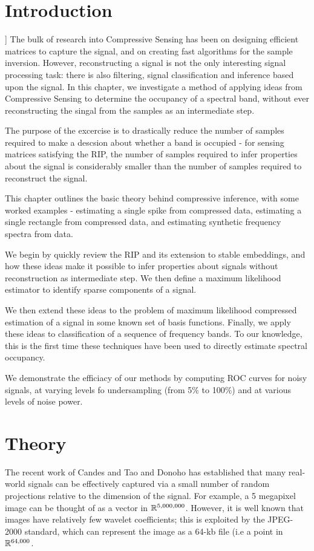\section{Introduction}]
The bulk of research into Compressive Sensing has been on designing efficient matrices to capture the signal, and on creating fast algorithms for the sample inversion. However, reconstructing a signal is not the only interesting signal processing task: there is also filtering, signal classification and inference based upon the signal. In this chapter, we investigate a method of applying ideas from Compressive Sensing to determine the occupancy of a spectral band, without ever reconstructing the singal from the samples as an intermediate step.

The purpose of the excercise is to drastically reduce the number of samples required to make a descsion about whether a band is occupied - for sensing matrices satisfying the RIP, the number of samples required to infer properties about the signal is considerably smaller than the number of samples required to reconstruct the signal. 

This chapter outlines the basic theory behind compressive inference, with some worked examples - estimating a single spike from compressed data, estimating a single rectangle from compressed data, and estimating synthetic frequency spectra from data. 

We begin by quickly review the RIP and its extension to stable embeddings, and how these ideas make it possible to infer properties about signals without reconstruction as intermediate step. We then define a maximum likelihood estimator to identify sparse components of a signal.

We then extend these ideas to the problem of maximum likelihood compressed estimation of a signal in some known set of basis functions. Finally, we apply these ideas to classification of a sequence of frequency bands. To our knowledge, this is the first time these techniques have been used to directly estimate spectral occupancy.

We demonstrate the efficiacy of our methods by computing ROC curves for noisy signals, at varying levels fo undersampling (from 5\% to 100\%) and at various levels of noise power.

\section{Theory}


The recent work of Candes and Tao \cite{Candes2006} and Donoho \cite{Donoho2006} has established that many real-world signals can be effectively captured via a small number of random projections relative to the dimension of the signal. For example, a 5 megapixel image can be thought of as a vector in \({\mathbb{R}}^{5,000,000}\). However, it is well known that images have relatively few wavelet coefficients; this is exploited by the JPEG-2000 standard, which can represent the image as a 64-kb file (i.e a point in \({\mathbb{R}}^{64,000}\).

